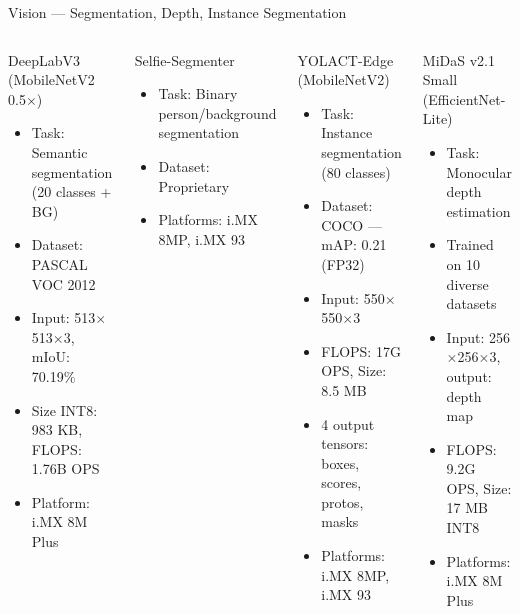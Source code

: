 \documentclass[aspectratio=169]{beamer}
\begin{document}
\begin{frame}{Vision — Segmentation, Depth, Instance Segmentation}
  \begin{columns}[T]
      \begin{block}{DeepLabV3 (MobileNetV2 0.5$\times$)}
        \begin{itemize}\scriptsize
          \item Task: Semantic segmentation (20 classes + BG)
          \item Dataset: PASCAL VOC 2012
          \item Input: 513$\times$513$\times$3, mIoU: \alert{70.19\%}
          \item Size INT8: \alert{983 KB}, FLOPS: 1.76B OPS
          \item Platform: i.MX 8M Plus
        \end{itemize}
      \end{block}
      \vspace{4pt}
      \begin{block}{Selfie-Segmenter}
        \begin{itemize}\scriptsize
          \item Task: Binary person/background segmentation
          \item Dataset: Proprietary
          \item Platforms: i.MX 8MP, i.MX 93
        \end{itemize}
      \end{block}
      \begin{block}{YOLACT-Edge (MobileNetV2)}
        \begin{itemize}\scriptsize
          \item Task: \alert{Instance segmentation} (80 classes)
          \item Dataset: COCO — mAP: 0.21 (FP32)
          \item Input: 550$\times$550$\times$3
          \item FLOPS: \alert{17G OPS}, Size: 8.5 MB
          \item 4 output tensors: boxes, scores, protos, masks
          \item Platforms: i.MX 8MP, i.MX 93
        \end{itemize}
      \end{block}
      \vspace{4pt}
      \begin{block}{MiDaS v2.1 Small (EfficientNet-Lite)}
        \begin{itemize}\scriptsize
          \item Task: Monocular depth estimation
          \item Trained on 10 diverse datasets
          \item Input: 256$\times$256$\times$3, output: depth map
          \item FLOPS: 9.2G OPS, Size: \alert{17 MB INT8}
          \item Platforms: i.MX 8M Plus
        \end{itemize}
      \end{block}
  \end{columns}
\end{frame}
\end{document}
